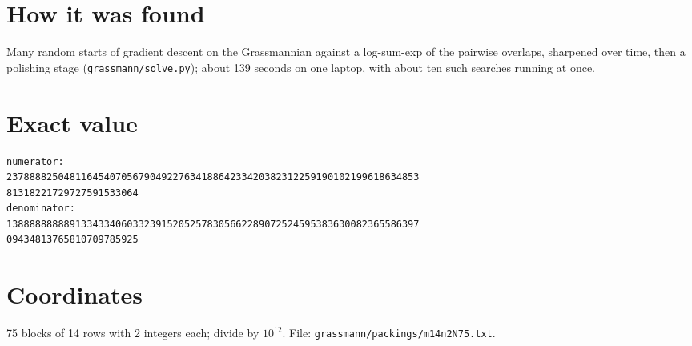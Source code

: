 \documentclass[11pt,a4paper]{article}
\begin{document}
\section{How it was found}
Many random starts of gradient descent on the Grassmannian against a log-sum-exp of the pairwise overlaps, sharpened over time, then a polishing stage (\texttt{grassmann/solve.py}); about 139 seconds on one laptop, with about ten such searches running at once.


\appendix
\section{Exact value}
{\small
\begin{verbatim}
numerator:
237888825048116454070567904922763418864233420382312259190102199618634853
81318221729727591533064
denominator:
138888888889133433406033239152052578305662289072524595383630082365586397
09434813765810709785925
\end{verbatim}}

\section{Coordinates}
75 blocks of 14 rows with 2 integers each; divide by $10^{12}$. File: \texttt{grassmann/packings/m14n2N75.txt}.
{\tiny
\begin{multicols}{4}
\end{multicols}}
\end{document}
